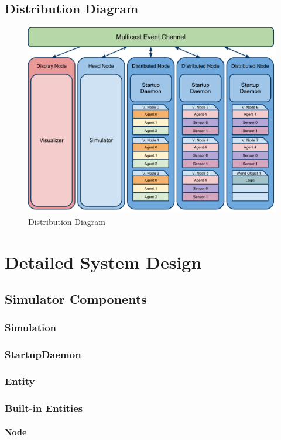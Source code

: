 \documentclass[titlepage]{article}
\begin{document}
\subsection{Distribution Diagram}
\begin{figure}%
    \centering
    \includegraphics[scale=.6]{../initial-pres/arch.pdf}
    \caption{Distribution Diagram}
    \label{fig-distribution}
\end{figure}

\section{Detailed System Design}

\subsection{Simulator Components}
\subsubsection{Simulation}
\subsubsection{StartupDaemon}
\subsubsection{Entity}
\subsubsection{Built-in Entities}
\paragraph{Node}
\end{document}
